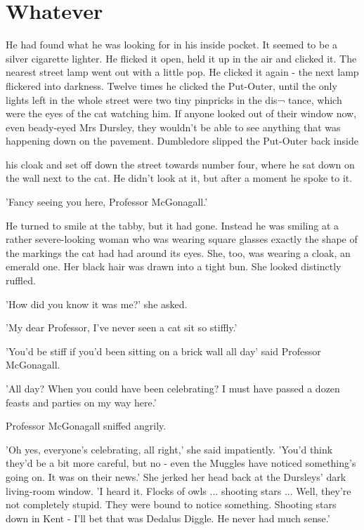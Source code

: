 \documentclass[twoside, openany]{report}
\begin{document}
\chapter{Whatever}

He had found what he was looking for in his inside pocket. It 
seemed to be a silver cigarette lighter. He flicked it open, held it 
up in the air and clicked it. The nearest street lamp went out with 
a little pop. He clicked it again - the next lamp flickered into 
darkness. Twelve times he clicked the Put-Outer, until the only 
lights left in the whole street were two tiny pinpricks in the dis¬ 
tance, which were the eyes of the cat watching him. If anyone 
looked out of their window now, even beady-eyed Mrs Dursley, 
they wouldn't be able to see anything that was happening down 
on the pavement. Dumbledore slipped the Put-Outer back inside 




his cloak and set off down the street towards number four, where 
he sat down on the wall next to the cat. He didn't look at it, but 
after a moment he spoke to it. 

'Fancy seeing you here, Professor McGonagall.' 

He turned to smile at the tabby, but it had gone. Instead he was 
smiling at a rather severe-looking woman who was wearing square 
glasses exactly the shape of the markings the cat had had around 
its eyes. She, too, was wearing a cloak, an emerald one. Her black 
hair was drawn into a tight bun. She looked distinctly ruffled. 

'How did you know it was me?' she asked. 

'My dear Professor, I've never seen a cat sit so stiffly.' 

'You'd be stiff if you'd been sitting on a brick wall all day' said 
Professor McGonagall. 

'All day? When you could have been celebrating? I must have 
passed a dozen feasts and parties on my way here.' 

Professor McGonagall sniffed angrily. 

'Oh yes, everyone's celebrating, all right,' she said impatiently. 
'You'd think they'd be a bit more careful, but no - even the 
Muggles have noticed something's going on. It was on their news.' 
She jerked her head back at the Dursleys' dark living-room 
window. 'I heard it. Flocks of owls ... shooting stars ... Well, 
they're not completely stupid. They were bound to notice 
something. Shooting stars down in Kent - I'll bet that was Dedalus 
Diggle. He never had much sense.' 
\end{document}

